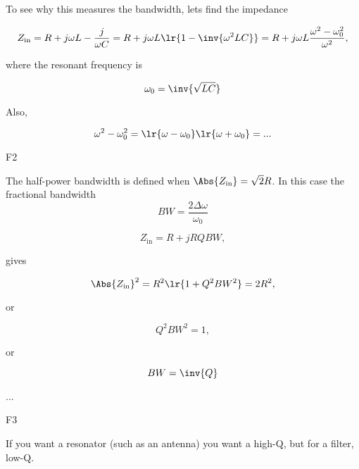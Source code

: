 To see why this measures the bandwidth, lets find the impedance

\begin{dmath}\label{eqn:uwavesDeck8ResonatorQfactorCore:160}
Z_{\textrm{in}} 
= R + j \omega L - \frac{j}{\omega C}
= R + j \omega L \lr{ 1 - \inv{\omega^2 L C} }
= R + j \omega L \frac{\omega^2 - \omega_0^2}{\omega^2}, 
\end{dmath}

where the resonant frequency is

\begin{dmath}\label{eqn:uwavesDeck8ResonatorQfactorCore:180}
\omega_0 = \inv{\sqrt{LC}}
\end{dmath}

Also, 

\begin{dmath}\label{eqn:uwavesDeck8ResonatorQfactorCore:200}
\omega^2 - \omega_0^2 = \lr{ \omega - \omega_0 }\lr{ \omega + \omega_0 }
= 
...
\end{dmath}

F2

The half-power bandwidth is defined when \( \Abs{Z_{\textrm{in}}} = \sqrt{2} R \).  In this case the fractional bandwidth 
\begin{dmath}\label{eqn:uwavesDeck8ResonatorQfactorCore:220}
BW = \frac{2 \Delta \omega}{\omega_0}
\end{dmath}

\begin{dmath}\label{eqn:uwavesDeck8ResonatorQfactorCore:240}
Z_{\textrm{in}} = R + j R Q BW, 
\end{dmath}

gives

\begin{dmath}\label{eqn:uwavesDeck8ResonatorQfactorCore:260}
\Abs{Z_{\textrm{in}}}^2 = R^2\lr{ 1 + Q^2 BW^2 } = 2 R^2,
\end{dmath}

or

\begin{dmath}\label{eqn:uwavesDeck8ResonatorQfactorCore:280}
Q^2 BW^2 = 1,
\end{dmath}

or

\begin{dmath}\label{eqn:uwavesDeck8ResonatorQfactorCore:300}
BW = \inv{Q}
\end{dmath}

...

F3

If you want a resonator (such as an antenna) you want a high-Q, but for a filter, low-Q.

